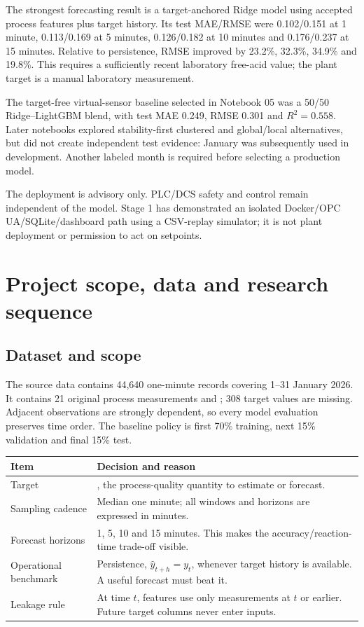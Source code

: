 \documentclass[10pt,a4paper]{article}
\begin{document}
The strongest forecasting result is a target-anchored Ridge model using accepted process features plus target history. Its test MAE/RMSE were 0.102/0.151 at 1 minute, 0.113/0.169 at 5 minutes, 0.126/0.182 at 10 minutes and 0.176/0.237 at 15 minutes. Relative to persistence, RMSE improved by 23.2\%, 32.3\%, 34.9\% and 19.8\%. This requires a sufficiently recent laboratory free-acid value; the plant target is a manual laboratory measurement.

The target-free virtual-sensor baseline selected in Notebook 05 was a 50/50 Ridge--LightGBM blend, with test MAE 0.249, RMSE 0.301 and $R^2=0.558$. Later notebooks explored stability-first clustered and global/local alternatives, but did not create independent test evidence: January was subsequently used in development. Another labeled month is required before selecting a production model.

The deployment is advisory only. PLC/DCS safety and control remain independent of the model. Stage 1 has demonstrated an isolated Docker/OPC UA/SQLite/dashboard path using a CSV-replay simulator; it is not plant deployment or permission to act on setpoints.

\section{Project scope, data and research sequence}
\subsection{Dataset and scope}
The source data contains 44,640 one-minute records covering 1--31 January 2026. It contains 21 original process measurements and ; 308 target values are missing. Adjacent observations are strongly dependent, so every model evaluation preserves time order. The baseline policy is first 70\% training, next 15\% validation and final 15\% test.
\begin{table}[H]\centering\begin{tabularx}{\textwidth}{L{0.29\textwidth}Y}\toprule
\textbf{Item} & \textbf{Decision and reason}\\\midrule
Target & , the process-quality quantity to estimate or forecast.\\
Sampling cadence & Median one minute; all windows and horizons are expressed in minutes.\\
Forecast horizons & 1, 5, 10 and 15 minutes. This makes the accuracy/reaction-time trade-off visible.\\
Operational benchmark & Persistence, $\hat y_{t+h}=y_t$, whenever target history is available. A useful forecast must beat it.\\
Leakage rule & At time $t$, features use only measurements at $t$ or earlier. Future target columns never enter inputs.\\\bottomrule\end{tabularx}\end{table}
\end{document}
